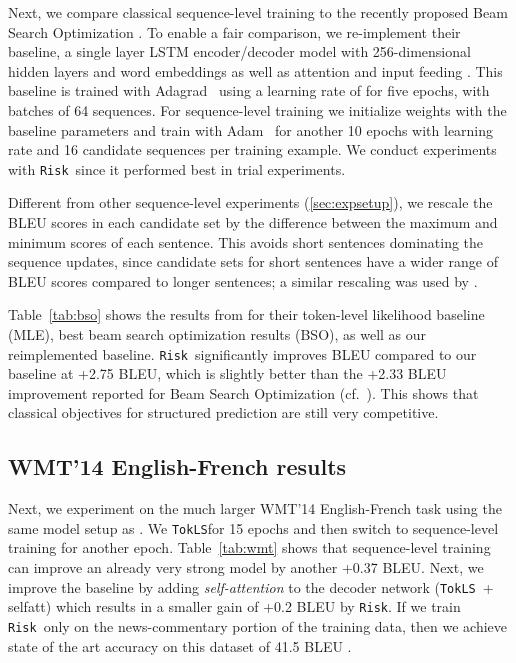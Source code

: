 \documentclass[11pt,a4paper]{article}
\newcommand{\TokLS}{\texttt{TokLS}}
\newcommand{\Risk}{\texttt{Risk}}
\begin{document}
Next, we compare classical sequence-level training to the recently proposed Beam Search Optimization \citep{wiseman2016acl}.
To enable a fair comparison, we re-implement their baseline, a single layer LSTM encoder/decoder model with 256-dimensional hidden layers and word embeddings as well as attention and input feeding \citep{luong2015effective}.
This baseline is trained with Adagrad~\citep{duchi2011adaptive} using a learning rate of  for five epochs, with batches of 64 sequences.
For sequence-level training we initialize weights with the baseline parameters and train with Adam~\citep{kingma2014adam} for another 10 epochs with learning rate  and 16 candidate sequences per training example.
We conduct experiments with \Risk~since it performed best in trial experiments.

Different from other sequence-level experiments (\textsection\ref{sec:expsetup}), we rescale the BLEU scores in each candidate set by the difference between the maximum and minimum scores of each sentence.
This avoids short sentences dominating the sequence updates, since candidate sets for short sentences have a wider range of BLEU scores compared to longer sentences; a similar rescaling was used by \citet{bahdanau2016ac}.

Table~\ref{tab:bso} shows the results from \citet{wiseman2016acl} for their token-level likelihood baseline (MLE), best beam search optimization results (BSO), as well as our reimplemented baseline.
\Risk~significantly improves BLEU compared to our baseline at +2.75 BLEU, which is slightly better than the +2.33 BLEU improvement reported for Beam Search Optimization (cf.~\citet{wiseman2016acl}).
This shows that classical objectives for structured prediction are still very competitive.


\subsection{WMT’14 English-French results}

Next, we experiment on the much larger WMT'14 English-French task using the same model setup as \citet{gehring2017icml}.
We \TokLS for 15 epochs and then switch to sequence-level training for another epoch. 
Table~\ref{tab:wmt} shows that sequence-level training can improve an already very strong model by another +0.37 BLEU. 
Next, we improve the baseline by adding \emph{self-attention} \citep{paulus2017summary,vaswani2017transformer} to the decoder network (\TokLS~+ selfatt) which results in a smaller gain of +0.2 BLEU by \Risk.
If we train \Risk~only on the news-commentary portion of the training data, then we achieve state of the art accuracy on this dataset of 41.5 BLEU \citep{yingce2017deliberation}.
\end{document}
